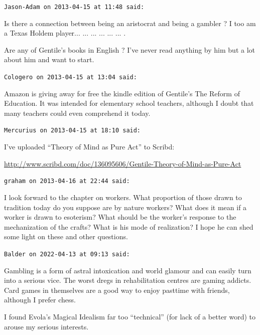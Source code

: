 \begin{footnotesize}
\begin{sffamily}
\texttt{Jason-Adam on 2013-04-15 at 11:48 said:}

Is there a connection between being an aristocrat and being a gambler ? I too am a Texas Holdem player... ... ... ... ... ... .

Are any of Gentile's books in English ? I've never read anything by him but a lot about him and want to start.

\hfill

\texttt{Cologero on 2013-04-15 at 13:04 said:}

Amazon is giving away for free the kindle edition of Gentile's The Reform of Education. It was intended for elementary school teachers, although I doubt that many teachers could even comprehend it today.

\hfill

\texttt{Mercurius on 2013-04-15 at 18:10 said:}

I've uploaded ``Theory of Mind as Pure Act'' to Scribd:

\url{http://www.scribd.com/doc/136095606/Gentile-Theory-of-Mind-as-Pure-Act}


\hfill

\texttt{graham on 2013-04-16 at 22:44 said:}

I look forward to the chapter on workers. What proportion of those drawn to tradition today do you suppose are by nature workers? What does it mean if a worker is drawn to esoterism? What should be the worker's response to the mechanization of the crafts? What is his mode of realization? I hope he can shed some light on these and other questions.

\hfill

\texttt{Balder on 2022-04-13 at 09:13 said:}

Gambling is a form of astral intoxication and world glamour and can easily turn into a serious vice. The worst dregs in rehabilitation centres are gaming addicts. Card games in themselves are a good way to enjoy pasttime with friends, although I prefer chess.

I found Evola's Magical Idealism far too ``technical'' (for lack of a better word) to arouse my serious interests.

\end{sffamily}
\end{footnotesize}

